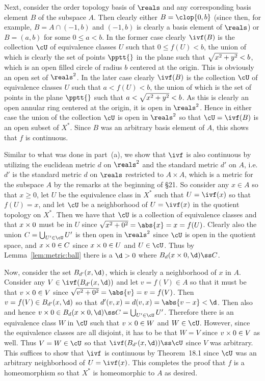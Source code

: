 {{    Next, consider the order topology basis of $\reals$ and any corresponding basis element $B$ of the subspace $A$.
    Then clearly either $B = \clop{0, b}$ (since then, for example, $B = A \cap (-1,b)$ and $(-1,b)$ is clearly a basis element of $\reals$) or $B = (a,b)$ for some $0 \leq a < b$.
    In the former case clearly $\ivf(B)$ is the collection $\cU$ of equivalence classes $U$ such that $0 \leq f(U) < b$, the union of which is clearly the set of points $\pptt{}$ in the plane such that $\sqrt{x_{}^2 + y_{}^2} < b$, which is an open filled circle of radius $b$ centered at the origin.
    This is obviously an open set of $\reals^2$.
    In the later case clearly $\ivf(B)$ is the collection $\cU$ of equivalence classes $U$ such that $a < f(U) < b$, the union of which is the set of points in the plane $\pptt{}$ such that $a < \sqrt{x_{}^2 + y_{}^2} < b$.
    As this is clearly an open annular ring centered at the origin, it is open in $\reals^2$.
    Hence in either case the union of the collection $\cU$ is open in $\reals^2$ so that $\cU = \ivf(B)$ is an open subset of $X^*$.
    Since $B$ was an arbitrary basis element of $A$, this shows that $f$ is continuous.

    Similar to what was done in part~(a), we show that $\ivf$ is also continuous by utilizing the euclidean metric $d$ on $\reals^2$ and the standard metric $d'$ on $A$, i.e. $d'$ is the standard metric $d$ on $\reals$ restricted to $A \times A$, which is a metric for the subspace $A$ by the remarks at the beginning of \S 21.
    So consider any $x \in A$ so that $x \geq 0$, let $U$ be the equivalence class in $X^*$ such that $U = \ivf(x)$ so that $f(U) = x$, and let $\cU$ be a neighborhood of $U = \ivf(x)$ in the quotient topology on $X^*$.
    Then we have that $\cU$ is a collection of equivalence classes and that $x \times 0$ must be in $U$ since $\sqrt{x^2 + 0^2} = \abs{x} = x = f(U)$.
    Clearly also the union $C = \bigcup_{U' \in \cU} U'$ is then open in $\reals^2$ since $\cU$ is open in the quotient space, and $x \times 0 \in C$ since $x \times 0 \in U$ and $U \in \cU$.
    Thus by Lemma~\ref{lem:metric:ball} there is a $\d > 0$ where $B_d(\pptz{x}, \d) \ss C$.

    Now, consider the set $B_{d'}(x, \d)$, which is clearly a neighborhood of $x$ in $A$.
    Consider any $V \in \ivf(B_{d'}(x, \d))$ and let $v = f(V) \in A$ so that it must be that $v \times 0 \in V$ since $\sqrt{v^2 + 0^2} = \abs{v} = v = f(V)$.
    Then $v = f(V) \in B_{d'}(x, \d)$ so that $d'(v,x) = d(v,x) = \abs{v-x} < \d$.
    Then also
    and hence $\pptz{v} \in B_d(\pptz{x}, \d) \ss C = \bigcup_{U' \in \cU} U'$.
    Therefore there is an equivalence class $W$ in $\cU$ such that $v \times 0 \in W$ and $W \in \cU$.
    However, since the equivalence classes are all disjoint, it has to be that $W = V$ since $v \times 0 \in V$ as well.
    Thus $V = W \in \cU$ so that $\ivf(B_{d'}(x,\d)) \ss \cU$ since $V$ was arbitrary.
    This suffices to show that $\ivf$ is continuous by Theorem~18.1 since $\cU$ was an arbitrary neighborhood of $U = \ivf(x)$.
    This completes the proof that $f$ is a homeomorphism so that $X^*$ is homeomorphic to $A$ as desired.
  }
}

